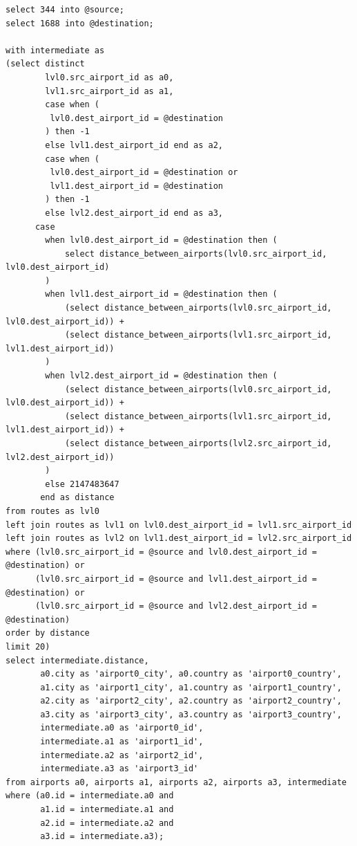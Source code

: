 \documentclass[12pt]{article}
\begin{document}
\begin{verbatim}
select 344 into @source;
select 1688 into @destination;
	   
with intermediate as
(select distinct 
		lvl0.src_airport_id as a0,
	    lvl1.src_airport_id as a1,
	    case when (
	     lvl0.dest_airport_id = @destination
	    ) then -1
	    else lvl1.dest_airport_id end as a2,
	    case when (
	     lvl0.dest_airport_id = @destination or
	     lvl1.dest_airport_id = @destination
	    ) then -1
	    else lvl2.dest_airport_id end as a3,
	  case
		when lvl0.dest_airport_id = @destination then (
			select distance_between_airports(lvl0.src_airport_id, lvl0.dest_airport_id)
		)
		when lvl1.dest_airport_id = @destination then (
			(select distance_between_airports(lvl0.src_airport_id, lvl0.dest_airport_id)) +
			(select distance_between_airports(lvl1.src_airport_id, lvl1.dest_airport_id))			
		)
		when lvl2.dest_airport_id = @destination then (
			(select distance_between_airports(lvl0.src_airport_id, lvl0.dest_airport_id)) +
			(select distance_between_airports(lvl1.src_airport_id, lvl1.dest_airport_id)) +
			(select distance_between_airports(lvl2.src_airport_id, lvl2.dest_airport_id))
		)
		else 2147483647
	   end as distance
from routes as lvl0
left join routes as lvl1 on lvl0.dest_airport_id = lvl1.src_airport_id
left join routes as lvl2 on lvl1.dest_airport_id = lvl2.src_airport_id
where (lvl0.src_airport_id = @source and lvl0.dest_airport_id = @destination) or
	  (lvl0.src_airport_id = @source and lvl1.dest_airport_id = @destination) or
      (lvl0.src_airport_id = @source and lvl2.dest_airport_id = @destination)
order by distance
limit 20)
select intermediate.distance,
	   a0.city as 'airport0_city', a0.country as 'airport0_country',
	   a1.city as 'airport1_city', a1.country as 'airport1_country', 
	   a2.city as 'airport2_city', a2.country as 'airport2_country', 
	   a3.city as 'airport3_city', a3.country as 'airport3_country',
	   intermediate.a0 as 'airport0_id',
	   intermediate.a1 as 'airport1_id',
	   intermediate.a2 as 'airport2_id',
	   intermediate.a3 as 'airport3_id'
from airports a0, airports a1, airports a2, airports a3, intermediate
where (a0.id = intermediate.a0 and
	   a1.id = intermediate.a1 and
	   a2.id = intermediate.a2 and
	   a3.id = intermediate.a3);	
\end{verbatim}
\end{document}
